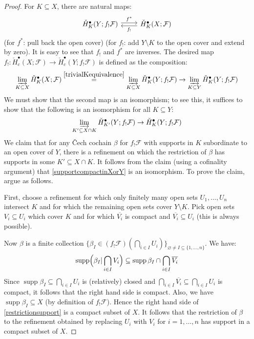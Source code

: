 \documentclass[12pt]{article}
\theoremstyle{definition}
\theoremstyle{remark}
\numberwithin{equation}{subsection}
\newcommand{\F}{\mathcal F}
\newcommand{\cH}{\check H}
\newcommand{\supp}{\operatorname{supp}}
\begin{document}
\begin{proof}
For $K\subseteq X$, there are natural maps:
\begin{equation}\label{trivialKequivalence}
\begin{tikzcd}
\cH^\bullet_K(Y;f_!\F)\ar[yshift=0.5ex]{r}{f^\ast}&\ar[yshift=-0.5ex]{l}{f_!}\cH^\bullet_K(X;\F)
\end{tikzcd}
\end{equation}
(for $f^\ast$: pull back the open cover) (for $f_!$: add $Y\setminus K$ to the open cover and extend by zero).  It is easy to see that $f_!$ and $f^\ast$ are inverses.  The desired map $f_!:\cH^\bullet_c(X;\F)\to\cH^\bullet_c(Y;f_!\F)$ is defined as the composition:
\begin{equation}
\varinjlim_{K\subseteq X}\cH^\bullet_K(X;\F)\overset{\eqref{trivialKequivalence}}=\varinjlim_{K\subseteq X}\cH^\bullet_K(Y;f_!\F)\to\varinjlim_{K\subseteq Y}\cH^\bullet_K(Y;f_!\F)
\end{equation}
We must show that the second map is an isomorphism; to see this, it suffices to show that the following is an isomorphism for all $K\subseteq Y$:
\begin{equation}\label{supportcompactinXorY}
\varinjlim_{K'\subseteq X\cap K}\cH^\bullet_{K'}(Y;f_!\F)\to\cH^\bullet_K(Y;f_!\F)
\end{equation}
We claim that for any \v Cech cochain $\beta$ for $f_!\F$ with supports in $K$ subordinate to an open cover of $Y$, there is a refinement on which the restriction of $\beta$ has supports in some $K'\subseteq X\cap K$.  It follows from the claim (using a cofinality argument) that \eqref{supportcompactinXorY} is an isomorphism.  To prove the claim, argue as follows.

First, choose a refinement for which only finitely many open sets $U_1,\ldots,U_n$ intersect $K$ and for which the remaining open sets cover $Y\setminus K$.  Pick open sets $V_i\subseteq U_i$ which cover $K$ and for which $\overline{V_i}$ is compact and $\overline{V_i}\subseteq U_i$ (this is always possible).

Now $\beta$ is a finite collection $\{\beta_I\in(f_!\F)(\bigcap_{i\in I}U_i)\}_{\varnothing\ne I\subseteq\{1,\ldots,n\}}$.  We have:
\begin{equation}\label{restrictionsupport}
\supp\Bigl(\beta_I|\bigcap_{i\in I}V_i\Bigr)\subseteq\supp\beta_I\cap\bigcap_{i\in I}\overline{V_i}
\end{equation}
Since $\supp\beta_I\subseteq\bigcap_{i\in I}U_i$ is (relatively) closed and $\bigcap_{i\in I}\overline{V_i}\subseteq\bigcap_{i\in I}U_i$ is compact, it follows that the right hand side is compact.  Also, we have $\supp\beta_I\subseteq X$ (by definition of $f_!\F$).  Hence the right hand side of \eqref{restrictionsupport} is a compact subset of $X$.  It follows that the restriction of $\beta$ to the refinement obtained by replacing $U_i$ with $V_i$ for $i=1,\ldots,n$ has support in a compact subset of $X$.
\end{proof}
\end{document}
